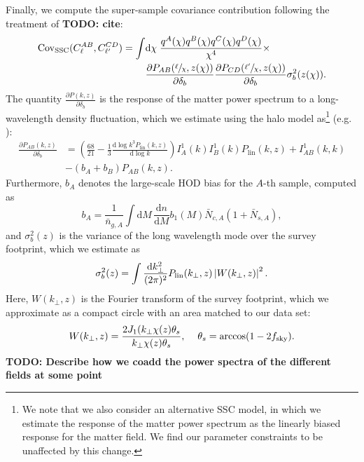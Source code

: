 \documentclass[a4paper,11pt]{article}
\newcommand{\todo}[1]{{\bf TODO: #1}}
\begin{document}
Finally, we compute the super-sample covariance contribution following the treatment of \todo{cite}:
\begin{align}
\mathrm{Cov}_{\mathrm{SSC}}(C^{AB}_{\ell}, C^{CD}_{\ell'}) = \int & \mathrm{d}\chi \;\frac{q^{A}(\chi)q^{B}(\chi)q^{C}(\chi)q^{D}(\chi)}{\chi^{4}} \times \\ &\frac{\partial P_{AB}(\sfrac{\ell}{\chi}, z(\chi))}{\partial \delta_{b}}\frac{\partial P_{CD}(\sfrac{\ell'}{\chi}, z(\chi))}{\partial \delta_{b}}\sigma^{2}_{b}(z(\chi)).
\end{align}
The quantity $\frac{\partial P(k, z)}{\partial \delta_b}$ is the response of the matter power spectrum to a long-wavelength density fluctuation, which we estimate using the halo model as\footnote{We note that we also consider an alternative SSC model, in which we estimate the response of the matter power spectrum as the linearly biased response for the matter field. We find our parameter constraints to be unaffected by this change.} (e.g. \cite{Krause:2017}):
\begin{align}
\frac{\partial P_{AB}(k, z)}{\partial \delta_{b}} &= \left( \frac{68}{21} - \frac{1}{3}\frac{\mathrm{d}\log{k^{3} P_{\mathrm{lin}}}(k, z)}{\mathrm{d}\log k} \right) I_{A}^{1}(k)I_{B}^{1}(k)P_{\mathrm{lin}}(k, z) + I_{AB}^{1}(k, k) \\ &- (b_{A} + b_{B})P_{AB}(k, z).
\end{align}
Furthermore, $b_{A}$ denotes the large-scale HOD bias for the $A$-th sample, computed as
\begin{equation}
b_{A}=\frac{1}{\bar{n}_{g, A}}\int \mathrm{d}M\,\frac{\mathrm{d}n}{\mathrm{d}M}b_{1}(M) \bar{N}_{c, A}(1+\bar{N}_{s, A}),
\end{equation}
and $\sigma_b^2(z)$ is the variance of the long wavelength mode over the survey footprint, which we estimate as
\begin{equation}
\sigma_b^2(z) = \int \frac{\mathrm{d}k_\perp^2}{(2\pi)^2}P_{\rm lin}(k_\perp,z)\left|W(k_\perp,z)\right|^2.
\end{equation}
Here, $W(k_\perp,z)$ is the Fourier transform of the survey footprint, which we approximate as a compact circle with an area matched to our data set:
\begin{equation}
W(k_\perp,z)=\frac{2 J_1(k_\perp\chi(z)\theta_s}{k_\perp \chi(z)\theta_s},\hspace{12pt} \theta_s={\rm arccos}(1-2f_{\rm sky}).
\end{equation}
 \todo{Describe how we coadd the power spectra of the different fields at some point}
\end{document}
